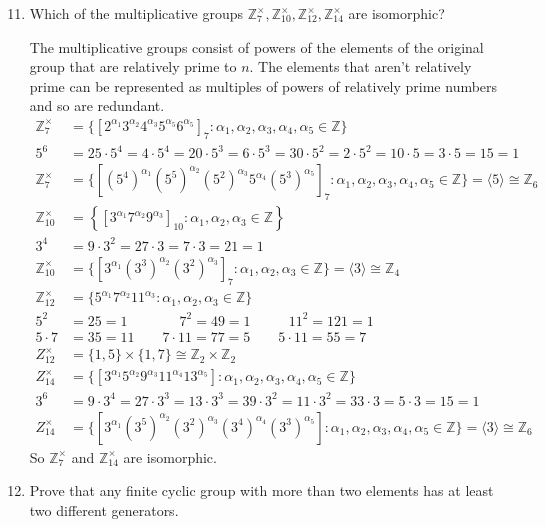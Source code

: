 \documentclass[letterpaper]{article}
\begin{document}
\begin{enumerate}
\begin{enumerate}
  \setcounter{enumii}{10}
  \item
    Which of the multiplicative groups $\mathbb{Z}_7^\times,\mathbb{Z}_{10}^\times,\mathbb{Z}_{12}^\times,\mathbb{Z}_{14}^\times$ are isomorphic?

    The multiplicative groups consist of powers of the elements of the original group that are relatively prime to $n$. The elements that aren't relatively prime can be represented as multiples of powers of relatively prime numbers and so are redundant.
    \begin{align*}
      \mathbb{Z}_7^\times&=\{[2^{\alpha_1}3^{\alpha_2}4^{\alpha_3}5^{\alpha_5}6^{\alpha_5}]_7:\alpha_1,\alpha_2,\alpha_3,\alpha_4,\alpha_5\in\mathbb{Z}\}\\
      5^6&=25\cdot5^4=4\cdot5^4=20\cdot5^3=6\cdot5^3=30\cdot5^2=2\cdot5^2=10\cdot5=3\cdot 5=15=1\\
      \mathbb{Z}_7^\times&=\{[\left(5^4\right)^{\alpha_1}\left(5^5\right)^{\alpha_2}\left(5^2\right)^{\alpha_3}5^{\alpha_4}\left(5^3\right)^{\alpha_5}]_7:\alpha_1,\alpha_2,\alpha_3,\alpha_4,\alpha_5\in\mathbb{Z}\}=\langle5\rangle\cong\mathbb{Z}_6\\
      \mathbb{Z}_{10}^\times&=\left\{\left[3^{\alpha_1}7^{\alpha_2}9^{\alpha_3}\right]_{10}:\alpha_1,\alpha_2,\alpha_3\in\mathbb{Z}\right\}\\
      3^4&=9\cdot3^2=27\cdot3=7\cdot3=21=1\\
      \mathbb{Z}_{10}^\times&=\{[3^{\alpha_1}\left(3^3\right)^{\alpha_2}\left(3^2\right)^{\alpha_3}]_7:\alpha_1,\alpha_2,\alpha_3\in\mathbb{Z}\}=\langle3\rangle\cong\mathbb{Z}_4\\
      \mathbb{Z}_{12}^\times&=\{5^{\alpha_1}7^{\alpha_2}11^{\alpha_3}:\alpha_1,\alpha_2,\alpha_3\in\mathbb{Z}\}\\
      5^2&=25=1\quad\quad\quad\;\;\,
      7^2=49=1\quad\quad\;\;\,
      11^2=121=1\\
      5\cdot7&=35=11\quad\quad
      7\cdot11=77=5\quad\quad
      5\cdot11=55=7\\
      Z_{12}^\times&=\{1,5\}\times\{1,7\}\cong\mathbb{Z}_2\times\mathbb{Z}_2\\
      Z_{14}^\times&=\{[3^{\alpha_1}5^{\alpha_2}9^{\alpha_3}11^{\alpha_4}13^{\alpha_5}]:\alpha_1,\alpha_2,\alpha_3,\alpha_4,\alpha_5\in\mathbb{Z}\}\\
      3^6&=9\cdot3^4=27\cdot3^3=13\cdot3^3=39\cdot3^2=11\cdot3^2=33\cdot3=5\cdot3=15=1\\
      Z_{14}^\times&=\{[3^{\alpha_1}\left(3^5\right)^{\alpha_2}\left(3^2\right)^{\alpha_3}\left(3^4\right)^{\alpha_4}\left(3^3\right)^{\alpha_5}]:\alpha_1,\alpha_2,\alpha_3,\alpha_4,\alpha_5\in\mathbb{Z}\}=\langle3\rangle\cong\mathbb{Z}_6
    \end{align*}
    So $\mathbb{Z}_7^\times$ and $\mathbb{Z}_{14}^\times$ are isomorphic.
  \setcounter{enumii}{14}
  \item
    Prove that any finite cyclic group with more than two elements has at least two different generators.


\end{enumerate}
\end{enumerate}
\end{document}
